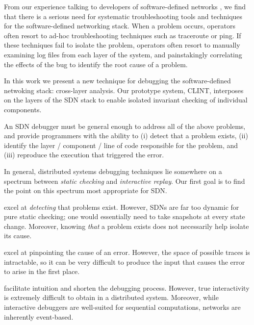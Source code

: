 From our experience talking to developers of software-defined networks
\cite{Nicira}, we find that there is a serious need for systematic troubleshooting
tools and techniques for the software-defined networking stack. When a problem occurs,
operators often resort to ad-hoc troubleshooting techniques such as traceroute or ping.
If these techniques fail to isolate the problem, operators often resort to
manually examining log files from each layer of the system, and painstakingly
correlating the effects of the bug to identify the root cause of a problem.

In this work we present a new technique for debugging the software-defined
netwoking stack: cross-layer analysis. Our prototype system, CLINT, interposes 
on the layers of the SDN stack to enable isolated invariant checking of individual
components.

An SDN debugger must be general enough to address all of the above problems, and provide programmers
with the ability to (i) detect that a problem exists, (ii) identify the layer / component / line of code
responsible for the problem, and (iii) reproduce the execution that triggered the error.

In general, distributed systems debugging techniques lie somewhere on a spectrum between
{\it static checking} and {\it interactive replay}. Our first goal is to find
the point on this spectrum most appropriate for SDN. 

 \cite{anteater} excel at {\it detecting} that problems
exist. However, SDNs are far too dynamic for pure static checking; one would
essentially need to take snapshots at every state change. Moreover,
            knowing {\it that} a problem exists does not necessarily help isolate its
            cause.

             \cite{x-trace} excel at pinpointing the cause of an
            error. However, the space of possible traces is intractable, so it can be very
            difficult to produce the input that causes the error to arise in the first
            place.

             facilitate intuition and shorten the
            debugging process. However, true interactivity is extremely difficult to
            obtain in a distributed system. 
            Moreover, while interactive debuggers are
            well-suited for sequential
            computations, networks are inherently event-based.

